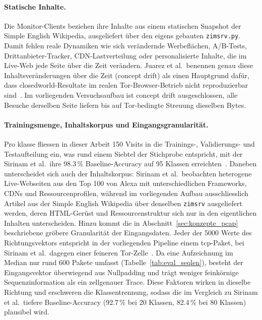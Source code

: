 \paragraph{Statische Inhalte.}
Die Monitor-Clients beziehen ihre Inhalte aus einem statischen Snapshot der Simple English Wikipedia, ausgeliefert über den eigens gebauten \texttt{zimsrv.py}.
Damit fehlen reale Dynamiken wie sich verändernde Werbeflächen, A/B-Tests, Drittanbieter-Tracker, CDN-Lastverteilung oder personalisierte Inhalte, die im Live-Web jede Seite über die Zeit verändern.
Juarez et al.\ benennen genau diese Inhaltsveränderungen über die Zeit (concept drift) als einen Hauptgrund dafür, dass \gls{closedworld}-Resultate im realen Tor-Browser-Betrieb nicht reproduzierbar sind~\cite{juarez2014critical}.
Im vorliegenden Versuchsaufbau ist concept drift ausgeschlossen, alle Besuche derselben Seite liefern bis auf Tor-bedingte Streuung dieselben Bytes.

\paragraph{Trainingsmenge, Inhaltskorpus und Eingangsgranularität.}
Pro \gls{klasse} fliessen in dieser Arbeit 150 Visits in die Trainings-, Validierungs- und Testaufteilung ein, was rund einem Siebtel der Stichprobe entspricht, mit der Sirinam et al.\ ihre 98.3\,\% Baseline-Accuracy auf 95 Klassen erreichten~\cite{sirinam2018deep}.
Daneben unterscheidet sich auch der Inhaltskorpus: Sirinam et al.\ beobachten heterogene Live-Webseiten aus den Top 100 von Alexa mit unterschiedlichen Frameworks, CDNs und Ressourcenprofilen, während im vorliegenden Aufbau ausschliesslich Artikel aus der Simple English Wikipedia über denselben \texttt{zimsrv} ausgeliefert werden, deren HTML-Gerüst und Ressourcenstruktur sich nur in den eigentlichen Inhalten unterscheiden.
Hinzu kommt die in Abschnitt~\ref{sec:konzepte_pcap} beschriebene gröbere Granularität der Eingangsdaten.
Jeder der 5000 Werte des Richtungsvektors entspricht in der vorliegenden Pipeline einem \gls{tcp}-Paket, bei Sirinam et al.\ dagegen einer feineren Tor-Zelle~\cite{sirinam2018deep}.
Da eine Aufzeichnung im Median nur rund 600 Pakete umfasst (Tabelle~\ref{tab:eval_seqlen}), besteht der Eingangsvektor überwiegend aus Nullpadding und trägt weniger feinkörnige Sequenzinformation als ein zellgenauer Trace.
Diese Faktoren wirken in dieselbe Richtung und erschweren die Klassentrennung, sodass die im Vergleich zu Sirinam et al.\ tiefere Baseline-Accuracy (92.7\,\% bei 20 Klassen, 82.4\,\% bei 80 Klassen) plausibel wird.

